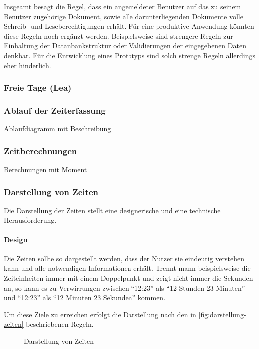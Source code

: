 


Insgeamt besagt die Regel,
dass ein angemeldeter Benutzer auf das zu seinem Benutzer zugehörige Dokument,
sowie alle darunterliegenden Dokumente volle Schreib- und Leseberechtigungen erhält.
Für eine produktive Anwendung könnten diese Regeln noch ergänzt werden.
Beispielsweise sind strengere Regeln zur Einhaltung der Datanbankstruktur oder Validierungen der eingegebenen Daten denkbar.
Für die Entwicklung eines Prototyps sind solch strenge Regeln allerdings eher hinderlich.

\subsubsection{Freie Tage (Lea)}

\subsubsection{Ablauf der Zeiterfassung}
Ablaufdiagramm mit Beschreibung

\subsubsection{Zeitberechnungen}
Berechnungen mit Moment

\subsubsection{Darstellung von Zeiten}
Die Darstellung der Zeiten stellt eine designerische und eine technische Herausforderung.

\paragraph{Design}
Die Zeiten sollte so dargestellt werden,
dass der Nutzer sie eindeutig verstehen kann und alle notwendigen Informationen erhält.
Trennt mann beispielsweise die Zeiteinheiten immer mit einem Doppelpunkt und zeigt nicht immer die Sekunden an,
so kann es zu Verwirrungen zwischen \enquote{12:23} als \enquote{12 Stunden 23 Minuten}
und \enquote{12:23} als \enquote{12 Minuten 23 Sekunden} kommen.

Um diese Ziele zu erreichen erfolgt die Darstellung nach den in \autoref{fig:darstellung-zeiten} beschriebenen Regeln.

\begin{figure}[ht!]
    \centering
    \resizebox{\textwidth}{!}{
        
    }
    \caption{Darstellung von Zeiten}
    \label{fig:darstellung-zeiten}
\end{figure}


